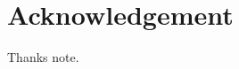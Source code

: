 \documentclass{acm_proc_article-sp}
\begin{document}
\section{Acknowledgement}
Thanks note.

%

%
%
\balancecolumns
\end{document}
